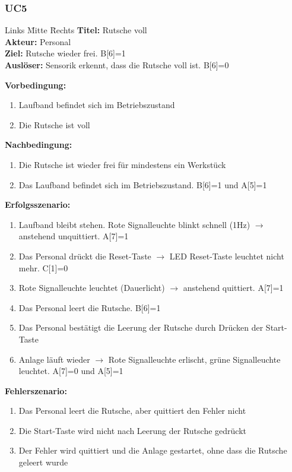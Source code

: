 \documentclass[oneside,a4paper,titlepage]{scrartcl} %
\begin{document}
\subsubsection{UC5}
\begin{tabbing}
 Links \= Mitte \= Rechts \kill
 \textbf{Titel:} \> \> Rutsche voll\\
 \textbf{Akteur:} \> \> Personal\\
 \textbf{Ziel:} \> \> Rutsche wieder frei. B[6]=1\\
 \textbf{Auslöser:} \> \> Sensorik erkennt, dass die Rutsche voll ist. B[6]=0\\
\end{tabbing}
\textbf{Vorbedingung:}
\begin{enumerate}
 \item Laufband befindet sich im Betriebszustand
 \item Die Rutsche ist voll
\end{enumerate}
\textbf{Nachbedingung:}
\begin{enumerate}
 \item Die Rutsche ist wieder frei für mindestens ein Werkstück
 \item Das Laufband befindet sich im Betriebszustand. B[6]=1 und A[5]=1
\end{enumerate}
\textbf{Erfolgsszenario:}
\begin{enumerate}
 \item Laufband bleibt stehen. Rote Signalleuchte blinkt schnell (1Hz) $\rightarrow$ anstehend unquittiert. A[7]=1
 \item Das Personal drückt die Reset-Taste $\rightarrow$ LED Reset-Taste leuchtet nicht mehr. C[1]=0
 \item Rote Signalleuchte leuchtet (Dauerlicht) $\rightarrow$ anstehend quittiert. A[7]=1
 \item Das Personal leert die Rutsche. B[6]=1
 \item Das Personal bestätigt die Leerung der Rutsche durch Drücken der Start-Taste
 \item Anlage läuft wieder $\rightarrow$ Rote Signalleuchte erlischt, grüne Signalleuchte leuchtet. A[7]=0 und A[5]=1
\end{enumerate}
\textbf{Fehlerszenario:}
\begin{enumerate}
 \item Das Personal leert die Rutsche, aber quittiert den Fehler nicht
 \item Die Start-Taste wird nicht nach Leerung der Rutsche gedrückt
 \item Der Fehler wird quittiert und die Anlage gestartet, ohne dass die Rutsche geleert wurde
\end{enumerate}
\end{document}
